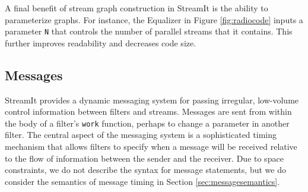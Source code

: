 A final benefit of stream graph construction in StreamIt is the
ability to parameterize graphs.  For instance, the Equalizer in Figure
\ref{fig:radiocode} inputs a parameter {\tt N} that controls the
number of parallel streams that it contains.  This further improves
readability and decreases code size.

\subsection{Messages}

StreamIt provides a dynamic messaging system for passing irregular,
low-volume control information between filters and streams.  Messages
are sent from within the body of a filter's {\tt work} function,
perhaps to change a parameter in another filter.  The central aspect
of the messaging system is a sophisticated timing mechanism that
allows filters to specify when a message will be received relative to
the flow of information between the sender and the receiver.  Due to
space constraints, we do not describe the syntax for message
statements, but we do consider the semantics of message timing in
Section \ref{sec:messagesemantics}.

